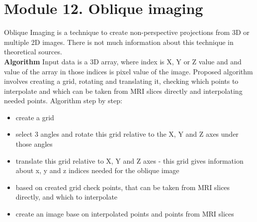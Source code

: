 \section{Module 12. Oblique imaging}

 \indent Oblique Imaging is a technique to create non-perspective
projections from 3D or multiple 2D images. There is not much information about this technique in theoretical sources. \\


\textbf{Algorithm}
\newline\indent Input data is a 3D array, where index is X, Y or Z value and and value of the array in those indices is pixel value of the image. Proposed algorithm involves creating a grid, rotating and translating it, checking which points to interpolate and which can be taken from MRI slices directly and interpolating needed points.
\newline Algorithm step by step:
\begin{itemize}
\item create a grid
\item select 3 angles and rotate this grid relative to the X, Y and Z axes under those angles
\item translate this grid relative to X, Y and Z axes - this grid gives information about x, y and z indices needed for the oblique image 
\item based on created grid check points, that can be taken from MRI slices directly, and which to interpolate
\item create an image base on interpolated points and points from MRI slices
\end{itemize}
